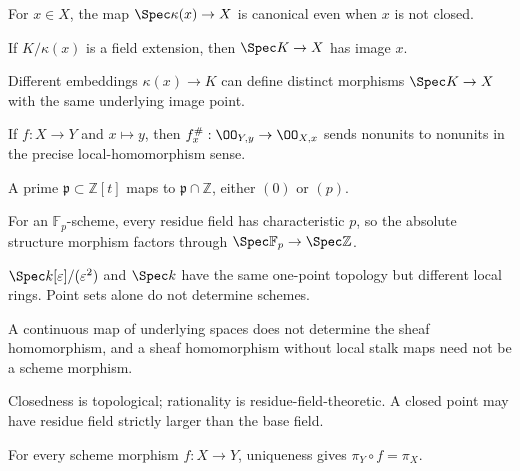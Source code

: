 \begin{example}\label{ex:vi21-e11}
For $x\in X$, the map $\Spec\kappa(x)\to X$ is canonical even when $x$ is not closed.
\end{example}
\begin{example}\label{ex:vi21-e12}
If $K/\kappa(x)$ is a field extension, then $\Spec K\to X$ has image $x$.
\end{example}
\begin{example}\label{ex:vi21-e13}
Different embeddings $\kappa(x)\to K$ can define distinct morphisms $\Spec K\to X$ with the same underlying image point.
\end{example}
\begin{example}\label{ex:vi21-e14}
If $f:X\to Y$ and $x\mapsto y$, then $f_x^\#:\OO_{Y,y}\to\OO_{X,x}$ sends nonunits to nonunits in the precise local-homomorphism sense.
\end{example}
\begin{example}\label{ex:vi21-e15}
A prime $\mathfrak p\subset\mathbb Z[t]$ maps to $\mathfrak p\cap\mathbb Z$, either $(0)$ or $(p)$.
\end{example}
\begin{example}\label{ex:vi21-e16}
For an $\mathbb F_p$-scheme, every residue field has characteristic $p$, so the absolute structure morphism factors through $\Spec\mathbb F_p\to\Spec\mathbb Z$.
\end{example}
\begin{example}\label{ex:vi21-e17}
$\Spec k[\varepsilon]/(\varepsilon^2)$ and $\Spec k$ have the same one-point topology but different local rings.  Point sets alone do not determine schemes.
\end{example}
\begin{example}\label{ex:vi21-e18}
A continuous map of underlying spaces does not determine the sheaf homomorphism, and a sheaf homomorphism without local stalk maps need not be a scheme morphism.
\end{example}
\begin{example}\label{ex:vi21-e19}
Closedness is topological; rationality is residue-field-theoretic.  A closed point may have residue field strictly larger than the base field.
\end{example}
\begin{example}\label{ex:vi21-e20}
For every scheme morphism $f:X\to Y$, uniqueness gives $\pi_Y\circ f=\pi_X$.
\end{example}
